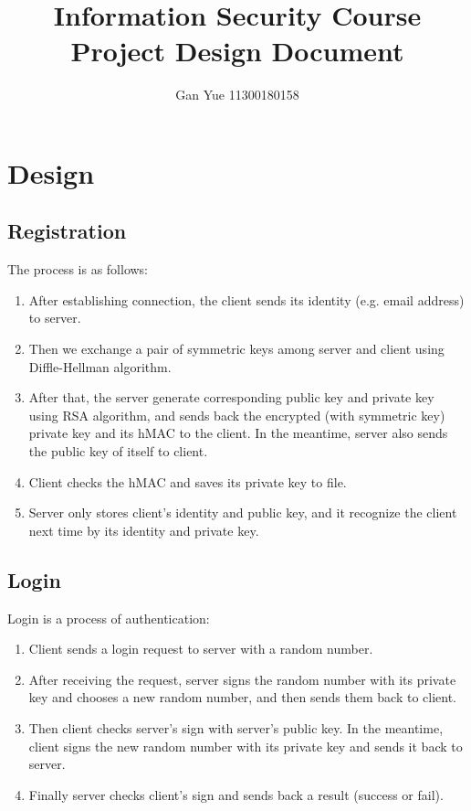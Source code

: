 \documentclass[11pt]{article}
\title{Information Security Course Project Design Document}
\author{Gan Yue 11300180158}
\begin{document}
\maketitle

\section{Design}
\subsection{Registration}
The process is as follows:
\begin{enumerate}
\item After establishing connection, the client sends its identity (e.g. email address) to server.
\item Then we exchange a pair of symmetric keys among server and client using Diffle-Hellman algorithm.
\item After that, the server generate corresponding public key and private key using RSA algorithm, and sends back the encrypted (with symmetric key) private key and its hMAC to the client. In the meantime, server also sends the public key of itself to client.
\item Client checks the hMAC and saves its private key to file.
\item Server only stores client's identity and public key, and it recognize the client next time by its identity and private key.
\end{enumerate}

\subsection{Login}
Login is a process of authentication:
\begin{enumerate}
\item Client sends a login request to server with a random number.
\item After receiving the request, server signs the random number with its private key and chooses a new random number, and then sends them back to client.
\item Then client checks server's sign with server's public key. In the meantime, client signs the new random number with its private key and sends it back to server.
\item Finally server checks client's sign and sends back a result (success or fail).
\end{enumerate}
\end{document}
